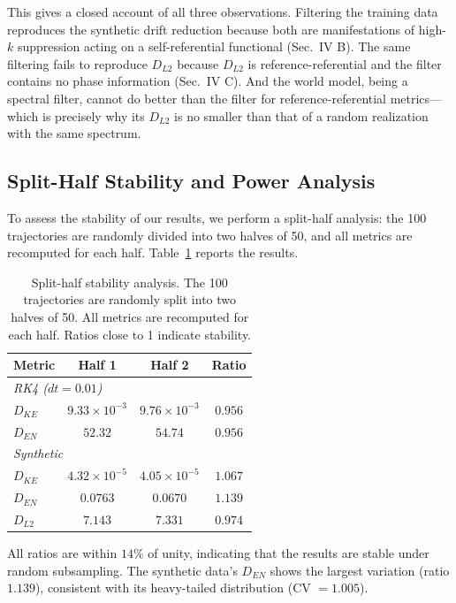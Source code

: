 \documentclass[reprint,aps,pre]{revtex4-2}
\begin{document}
This gives a closed account of all three observations. Filtering the training data reproduces the synthetic drift reduction because both are manifestations of high-$k$ suppression acting on a self-referential functional (Sec.~IV B). The same filtering fails to reproduce $D_{L2}$ because $D_{L2}$ is reference-referential and the filter contains no phase information (Sec.~IV C). And the world model, being a spectral filter, cannot do better than the filter for reference-referential metrics---which is precisely why its $D_{L2}$ is no smaller than that of a random realization with the same spectrum.

\subsection{Split-Half Stability and Power Analysis}

To assess the stability of our results, we perform a split-half analysis: the 100 trajectories are randomly divided into two halves of 50, and all metrics are recomputed for each half. Table~\ref{tab:split} reports the results.

\begin{table}[t]
\caption{Split-half stability analysis. The 100 trajectories are randomly split into two halves of 50. All metrics are recomputed for each half. Ratios close to 1 indicate stability.}
\label{tab:split}
\begin{ruledtabular}
\begin{tabular}{lccc}
Metric & Half 1 & Half 2 & Ratio \\
\hline
\multicolumn{4}{l}{\textit{RK4 ($dt=0.01$)}} \\
$D_{KE}$ & $9.33\times10^{-3}$ & $9.76\times10^{-3}$ & $0.956$ \\
$D_{EN}$ & $52.32$ & $54.74$ & $0.956$ \\
\hline
\multicolumn{4}{l}{\textit{Synthetic}} \\
$D_{KE}$ & $4.32\times10^{-5}$ & $4.05\times10^{-5}$ & $1.067$ \\
$D_{EN}$ & $0.0763$ & $0.0670$ & $1.139$ \\
$D_{L2}$ & $7.143$ & $7.331$ & $0.974$ \\
\end{tabular}
\end{ruledtabular}
\end{table}

All ratios are within $14\%$ of unity, indicating that the results are stable under random subsampling. The synthetic data's $D_{EN}$ shows the largest variation (ratio $1.139$), consistent with its heavy-tailed distribution (CV $= 1.005$).
\end{document}
